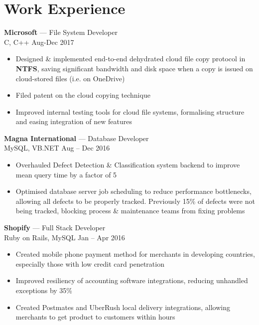 \documentclass[letterpaper,10pt]{article}
\newcommand{\comment}[1]{}
\begin{document}
\begin{minipage}[t]{0.6\textwidth} %

\section{Work Experience}
\medskip

{\large
\textbf{Microsoft} --- File System Developer\\
}
{\footnotesize
C, C++ \hfill Aug-Dec 2017
}
\begin{itemize}
    \item {Designed \& implemented end-to-end dehydrated cloud file copy protocol in \textbf{NTFS}, saving significant bandwidth and disk space when a copy is issued on cloud-stored files (i.e. on OneDrive)}
    \item {Filed patent on the cloud copying technique}   %
    \item {Improved internal testing tools for cloud file systems, formalising structure and easing integration of new features}
\end{itemize}
\bigskip

{\large
\textbf{Magna International} --- Database Developer\\
}
{\footnotesize
MySQL, VB.NET \hfill Aug -- Dec 2016
}
\begin{itemize}
    \item {Overhauled Defect Detection \& Classification system backend to improve mean query time by a factor of 5}
    \item {Optimised database server job scheduling to reduce performance bottlenecks, allowing all defects to be properly tracked. Previously 15\% of defects were not being tracked, blocking process \& maintenance teams from fixing problems}
\comment{    \item {Implemented automatic reconnection for dropped mould HMI connections, saving 10 man-hours per week}}
\end{itemize}
\bigskip

{\large
\textbf{Shopify} --- Full Stack Developer\\
}
{\footnotesize
Ruby on Rails, MySQL \hfill Jan -- Apr 2016
}
\begin{itemize}
    \item {Created mobile phone payment method for merchants in developing countries, especially those with low credit card penetration}
    \item {Improved resiliency of accounting software integrations, reducing unhandled exceptions by 35\%}
    \item {Created Postmates and UberRush local delivery integrations, allowing merchants to get product to customers within hours}
\end{itemize}
\bigskip


\end{minipage}
\end{document}
